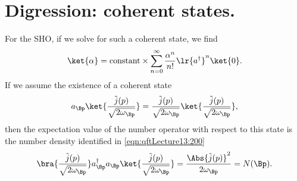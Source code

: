 %
%
\section{Digression: coherent states.}
For the SHO, if we solve for such a coherent state, we find
\begin{dmath}\label{eqn:qftLecture13:240}
\ket{\alpha} = \text{constant} \times \sum_{n = 0}^\infty \frac{\alpha^n}{n!} \lr{ a^\dagger }^n \ket{0}.
\end{dmath}
If we assume the existence of a coherent state
\begin{dmath}\label{eqn:qftLecture13:260}
a_\Bp \ket{
\frac{\tilde{j}(p)}{\sqrt{2 \omega_\Bp}}
}
=
\frac{\tilde{j}(p)}{\sqrt{2 \omega_\Bp}}
\ket{
\frac{\tilde{j}(p)}{\sqrt{2 \omega_\Bp}}
},
\end{dmath}
then the expectation value of the number operator with respect to this state is the number density identified in \cref{eqn:qftLecture13:200}
\begin{equation}\label{eqn:qftLecture13:1200}
\bra{
\frac{\tilde{j}(p)}{\sqrt{2 \omega_\Bp}}
}
a_\Bp^\dagger a_\Bp
\ket{
\frac{\tilde{j}(p)}{\sqrt{2 \omega_\Bp}}
} = \frac{\Abs{\tilde{j}(p)}^2}{2 \omega_\Bp} = N(\Bp).
\end{equation}
